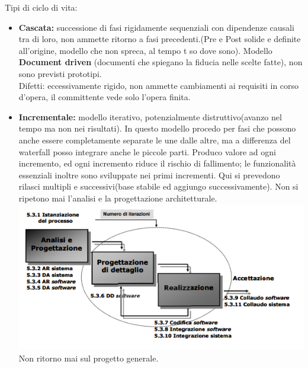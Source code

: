 Tipi di ciclo di vita:
\begin{itemize}
	\item \textbf{Cascata:} successione di fasi rigidamente sequenziali con dipendenze causali tra di loro, non ammette ritorno a fasi precedenti.(Pre e Post solide e definite all'origine, modello che non spreca, al tempo t so dove sono). Modello \textbf{Document driven} (documenti che spiegano la fiducia nelle scelte fatte), non sono previsti prototipi.\\
	Difetti: eccessivamente rigido, non ammette cambiamenti ai requisiti in corso d'opera, il committente vede solo l'opera finita.
	\item \textbf{Incrementale:} modello iterativo, potenzialmente distruttivo(avanzo nel tempo ma non nei risultati). In questo modello procedo per fasi che possono anche essere completamente separate le une dalle altre, ma a differenza del waterfall posso integrare anche le piccole parti. Produco valore ad ogni incremento, ed ogni incremento riduce il rischio di fallimento; le funzionalità essenziali inoltre sono sviluppate nei primi incrementi.
	Qui si prevedono rilasci multipli e successivi(base stabile ed aggiungo successivamente). Non si ripetono mai l'analisi e la progettazione architetturale.
	\includegraphics[width=0.75\columnwidth]{img4} %
	\\Non ritorno mai sul progetto generale.\\
	

\end{itemize}
